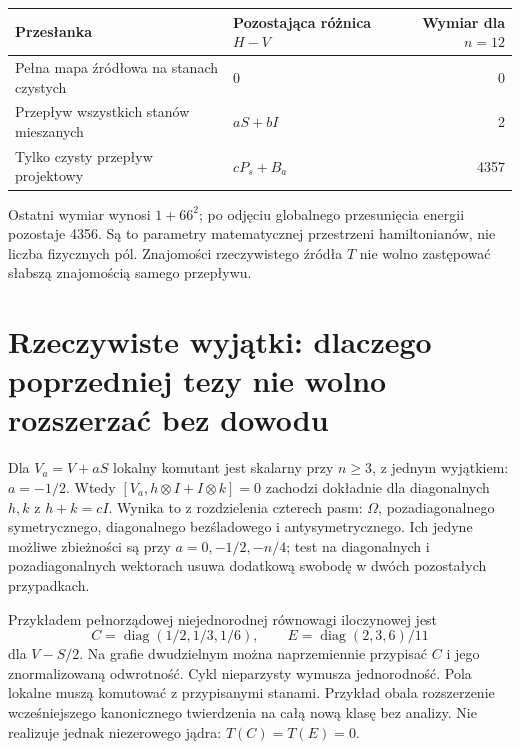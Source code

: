 \documentclass[11pt,a4paper]{article}
\begin{document}
\begin{center}
\begin{tabular}{p{6.1cm}p{5.0cm}r}
Przesłanka & Pozostająca różnica $H-V$ & Wymiar dla $n=12$\\\hline
Pełna mapa źródłowa na stanach czystych & $0$ & 0\\
Przepływ wszystkich stanów mieszanych & $aS+bI$ & 2\\
Tylko czysty przepływ projektowy & $cP_s+B_a$ & 4357
\end{tabular}
\end{center}
Ostatni wymiar wynosi $1+66^2$; po odjęciu globalnego przesunięcia
energii pozostaje 4356. Są to parametry matematycznej przestrzeni
hamiltonianów, nie liczba fizycznych pól. Znajomości rzeczywistego
źródła $T$ nie wolno zastępować słabszą znajomością samego przepływu.

\section{Rzeczywiste wyjątki: dlaczego poprzedniej tezy nie wolno rozszerzać bez dowodu}

Dla $V_a=V+aS$ lokalny komutant jest skalarny przy $n\ge3$,
z jednym wyjątkiem: $a=-1/2$. Wtedy
$[V_a,h\otimes I+I\otimes k]=0$ zachodzi dokładnie dla diagonalnych
$h,k$ z $h+k=cI$. Wynika to z rozdzielenia czterech pasm:
$\Omega$, pozadiagonalnego symetrycznego, diagonalnego bezśladowego
i antysymetrycznego. Ich jedyne możliwe zbieżności są przy
$a=0,-1/2,-n/4$; test na diagonalnych i pozadiagonalnych wektorach
usuwa dodatkową swobodę w dwóch pozostałych przypadkach.

Przykładem pełnorządowej niejednorodnej równowagi iloczynowej jest
\[
 C=\operatorname{diag}(1/2,1/3,1/6),\qquad
 E=\operatorname{diag}(2,3,6)/11
\]
dla $V-S/2$. Na grafie dwudzielnym można naprzemiennie przypisać
$C$ i jego znormalizowaną odwrotność. Cykl nieparzysty wymusza
jednorodność. Pola lokalne muszą komutować z przypisanymi stanami.
Przykład obala rozszerzenie wcześniejszego kanonicznego twierdzenia
na całą nową klasę bez analizy. Nie realizuje jednak niezerowego jądra:
$T(C)=T(E)=0$.
\end{document}
